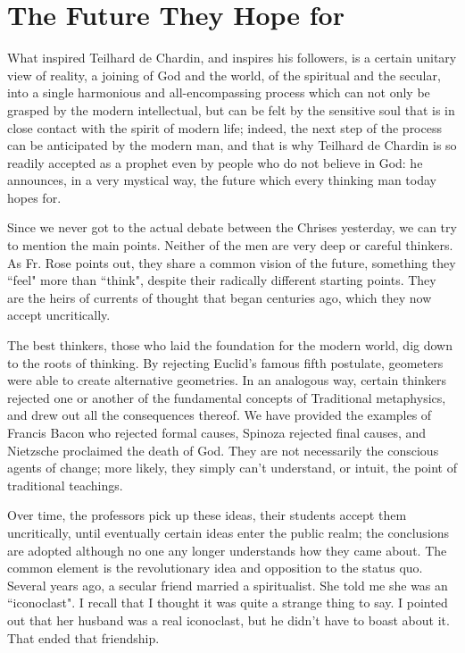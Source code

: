 \section{The Future They Hope for}

\begin{quotex}
What inspired Teilhard de Chardin, and inspires his followers, is a certain unitary view of reality, a joining of God and the world, of the spiritual and the secular, into a single harmonious and all-encompassing process which can not only be grasped by the modern intellectual, but can be felt by the sensitive soul that is in close contact with the spirit of modern life; indeed, the next step of the process can be anticipated by the modern man, and that is why Teilhard de Chardin is so readily accepted as a prophet even by people who do not believe in God: he announces, in a very mystical way, the future which every thinking man today hopes for. 

\end{quotex}
Since we never got to the actual debate between the Chrises yesterday, we can try to mention the main points. Neither of the men are very deep or careful thinkers. As Fr. Rose points out, they share a common vision of the future, something they ``feel" more than ``think", despite their radically different starting points. They are the heirs of currents of thought that began centuries ago, which they now accept uncritically.

The best thinkers, those who laid the foundation for the modern world, dig down to the roots of thinking. By rejecting Euclid's famous fifth postulate, geometers were able to create alternative geometries. In an analogous way, certain thinkers rejected one or another of the fundamental concepts of Traditional metaphysics, and drew out all the consequences thereof. We have provided the examples of Francis Bacon who rejected formal causes, Spinoza rejected final causes, and Nietzsche proclaimed the death of God. They are not necessarily the conscious agents of change; more likely, they simply can't understand, or intuit, the point of traditional teachings.

Over time, the professors pick up these ideas, their students accept them uncritically, until eventually certain ideas enter the public realm; the conclusions are adopted although no one any longer understands how they came about. The common element is the revolutionary idea and opposition to the status quo. Several years ago, a secular friend married a spiritualist. She told me she was an ``iconoclast". I recall that I thought it was quite a strange thing to say. I pointed out that her husband was a real iconoclast, but he didn't have to boast about it. That ended that friendship.

